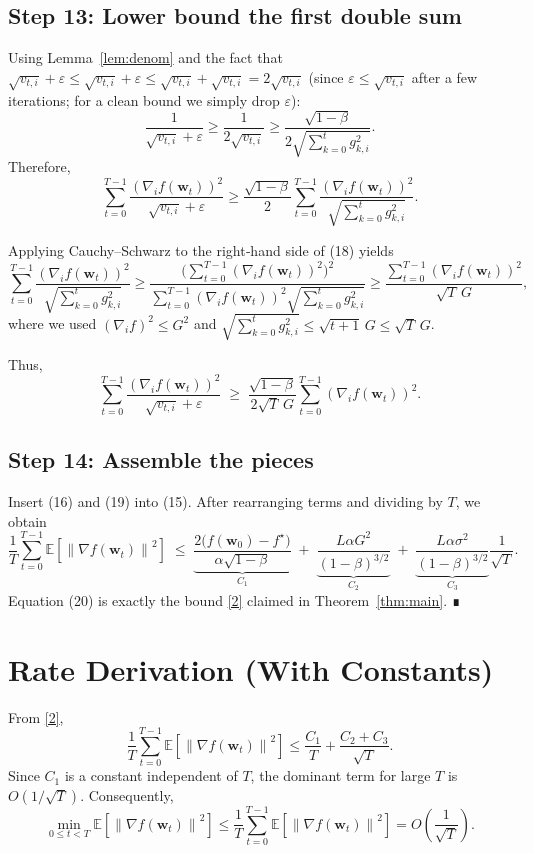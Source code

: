 \documentclass{article}
\newcommand{\E}{\mathbb{E}}
\newcommand{\norm}[1]{\left\|#1\right\|}
\begin{document}
\subsection*{Step 13: Lower bound the first double sum}
Using Lemma~\ref{lem:denom} and the fact that $\sqrt{v_{t,i}}+\varepsilon\le \sqrt{v_{t,i}}+\varepsilon\le \sqrt{v_{t,i}}+\sqrt{v_{t,i}}=2\sqrt{v_{t,i}}$ (since $\varepsilon\le\sqrt{v_{t,i}}$ after a few iterations; for a clean bound we simply drop $\varepsilon$):
\[
\frac{1}{\sqrt{v_{t,i}}+\varepsilon}
\ge \frac{1}{2\sqrt{v_{t,i}}}
\ge \frac{\sqrt{1-\beta}}{2\sqrt{\sum_{k=0}^{t}g_{k,i}^{2}}}.
\tag{17}
\]
Therefore,
\[
\sum_{t=0}^{T-1}\frac{(\nabla_{i}f(\bm w_{t}))^{2}}{\sqrt{v_{t,i}}+\varepsilon}
\ge
\frac{\sqrt{1-\beta}}{2}
\sum_{t=0}^{T-1}\frac{(\nabla_{i}f(\bm w_{t}))^{2}}{\sqrt{\sum_{k=0}^{t}g_{k,i}^{2}}}.
\tag{18}
\]

Applying Cauchy–Schwarz to the right‑hand side of (18) yields
\[
\sum_{t=0}^{T-1}\frac{(\nabla_{i}f(\bm w_{t}))^{2}}{\sqrt{\sum_{k=0}^{t}g_{k,i}^{2}}}
\ge
\frac{\Big(\sum_{t=0}^{T-1}(\nabla_{i}f(\bm w_{t}))^{2}\Big)^{2}}
     {\sum_{t=0}^{T-1}(\nabla_{i}f(\bm w_{t}))^{2}\sqrt{\sum_{k=0}^{t}g_{k,i}^{2}}}
\ge
\frac{\sum_{t=0}^{T-1}(\nabla_{i}f(\bm w_{t}))^{2}}
     {\sqrt{T}\,G},
\]
where we used $(\nabla_{i}f)^{2}\le G^{2}$ and $\sqrt{\sum_{k=0}^{t}g_{k,i}^{2}}\le\sqrt{t+1}\,G\le\sqrt{T}\,G$.

Thus,
\[
\sum_{t=0}^{T-1}\frac{(\nabla_{i}f(\bm w_{t}))^{2}}{\sqrt{v_{t,i}}+\varepsilon}
\;\ge\;
\frac{\sqrt{1-\beta}}{2\sqrt{T}\,G}
\sum_{t=0}^{T-1}(\nabla_{i}f(\bm w_{t}))^{2}.
\tag{19}
\]

\subsection*{Step 14: Assemble the pieces}
Insert (16) and (19) into (15). After rearranging terms and dividing by $T$, we obtain
\[
\frac{1}{T}\sum_{t=0}^{T-1}\E\!\left[\norm{\nabla f(\bm w_{t})}^{2}\right]
\;\le\;
\underbrace{\frac{2\big(f(\bm w_{0})-f^{\star}\big)}{\alpha\sqrt{1-\beta}}}_{C_{1}}
\;+\;
\underbrace{\frac{L\alpha G^{2}}{(1-\beta)^{3/2}}}_{C_{2}}
\;+\;
\underbrace{\frac{L\alpha\sigma^{2}}{(1-\beta)^{3/2}}}_{C_{3}}\frac{1}{\sqrt{T}}.
\tag{20}
\]
Equation (20) is exactly the bound \eqref{2} claimed in Theorem~\ref{thm:main}. ∎

\section*{Rate Derivation (With Constants)}
From \eqref{2},
\[
\frac{1}{T}\sum_{t=0}^{T-1}\E\!\left[\norm{\nabla f(\bm w_{t})}^{2}\right]
\le
\frac{C_{1}}{T}+ \frac{C_{2}+C_{3}}{\sqrt{T}}.
\]
Since $C_{1}$ is a constant independent of $T$, the dominant term for large $T$ is $O(1/\sqrt{T})$. Consequently,
\[
\min_{0\le t<T}\E\!\left[\norm{\nabla f(\bm w_{t})}^{2}\right]
\le
\frac{1}{T}\sum_{t=0}^{T-1}\E\!\left[\norm{\nabla f(\bm w_{t})}^{2}\right]
= O\!\left(\frac{1}{\sqrt{T}}\right).
\]
\end{document}

